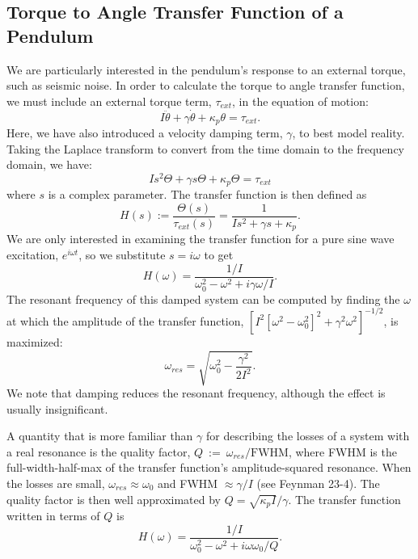 \subsection{Torque to Angle Transfer Function of a Pendulum}
\label{sec:t2a}
We are particularly interested in the pendulum's response to an
external torque, such as seismic noise. In order to calculate the
torque to angle transfer function, we must include an external torque
term, $\tau_{ext}$, in the equation of motion:
\begin{equation}
I \ddot{\theta} + \gamma \dot{\theta} + \kappa_p \theta = \tau_{ext}.
\label{eq:eqmotion}
\end{equation}
Here, we have also introduced a velocity damping term, $\gamma$, to
best model reality. Taking the Laplace transform to convert from the
time domain to the frequency domain, we have:
\begin{equation}
I s^2 \Theta + \gamma s \Theta + \kappa_p \Theta = \tau_{ext}
\end{equation}
where $s$ is a complex parameter. The transfer function is then
defined as
\begin{equation}
H(s) := \frac{\Theta(s)}{\tau_{ext}(s)} = \frac{1}{I s^2 + \gamma s + \kappa_p}.
\label{eq:TF}
\end{equation}
We are only interested in examining the transfer function for a pure
sine wave excitation, $e^{i\omega t}$, so we substitute $s=i\omega$ to
get
\begin{equation}
H(\omega) = \frac{1/I}{\omega_0^2  - \omega^2 + i \gamma \omega / I}.
\end{equation}
The resonant frequency of this damped system can be computed by finding the
$\omega$ at which the amplitude of the transfer function, $[I^2
[\omega^2 - \omega_0^2]^2 + \gamma^2 \omega^2]^{-1/2}$, is maximized:
\begin{equation}
\omega_{res} = \sqrt{\omega_0^2 - \frac{\gamma^2}{2I^2}}.
\end{equation}
We note that damping reduces the resonant frequency, although the effect is usually insignificant.

A quantity that is more familiar than $\gamma$ for describing the losses of a system with a real resonance is the quality factor, $Q~:=~\omega_{res}/\mathrm{FWHM}$, where FWHM is the full-width-half-max of the transfer function's amplitude-squared resonance. When the losses are small, $\omega_{res} \approx \omega_0$ and FWHM $\approx \gamma/I$ (see Feynman 23-4). The quality factor is then well approximated by $Q = \sqrt{\kappa_p I}/\gamma$. The transfer function written in terms of $Q$ is \begin{equation} H(\omega) = \frac{1/I}{\omega_0^2 - \omega^2 + i \omega \omega_0 / Q}.  \label{eq:TFpendulum} \end{equation}

